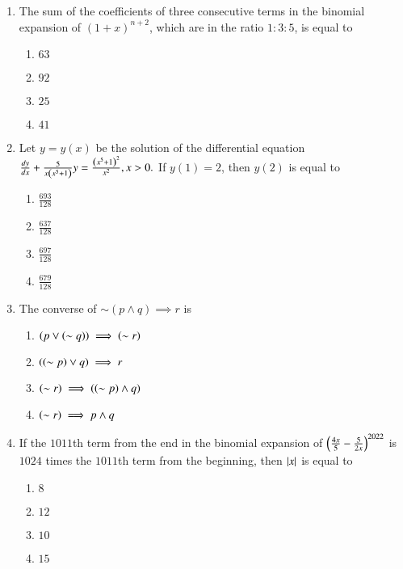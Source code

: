 \documentclass[journal,9pt,onecolumn]{IEEEtran}
\begin{document}
\begin{enumerate}
\item The sum of the coefficients of three consecutive terms in the binomial expansion of $(1 + x)^{n+2}$, which are in the ratio $1 : 3 : 5$, is equal to 
\begin{multicols}{4}
\begin{enumerate}
    \item $63$
    \item $92$
    \item $25$
    \item $41$
\end{enumerate}
\end{multicols}

\item Let $y = y(x)$ be the solution of the differential equation $\frac{dy}{dx} + \frac{5}{x\left(x^5 + 1\right)}y = \frac{\left(x^5 +1\right)^2}{x^2}, x > 0.$ If $y(1) = 2$, then $y(2)$ is equal to 
\begin{multicols}{4}
\begin{enumerate}
    \item $\frac{693}{128}$
    \item $\frac{637}{128}$
    \item $\frac{697}{128}$
    \item $\frac{679}{128}$
\end{enumerate}
\end{multicols}



\item The converse of $\sim(p \land q) \implies r$ is 
\begin{multicols}{2}
\begin{enumerate}
    \item $\left(p \lor \left(\sim q\right)\right) \implies \left( \sim r\right)$ 
    \item $\left(\left(\sim p\right) \lor q\right) \implies  r$
    \item $\left(\sim r\right) \implies \left( \left(\sim p\right) \land q\right)$ 
    \item $\left(\sim r\right) \implies  p \land q$
\end{enumerate}
\end{multicols}



\item If the $1011$th term from the end in the binomial expansion of $\left(\frac{4x}{5} - \frac{5}{2x} \right)^{2022}$ is $1024$ times the $1011$th term from the beginning, then $\left\vert x\right\vert$ is equal to 
\begin{multicols}{4}
\begin{enumerate}
    \item $8$ 
    \item $12$ 
    \item $10$ 
    \item $15$ 
\end{enumerate}
\end{multicols}



\end{enumerate}
\end{document}
